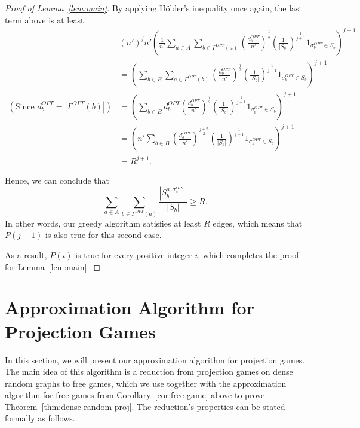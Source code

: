 \documentclass{article}
\begin{document}
\begin{proof}[Proof of Lemma~\ref{lem:main}]
By applying H\"{o}lder's inequality once again, the last term above is at least
\begin{align*}
  &(n')^j n' \left(\frac{1}{n'} \sum_{a \in A} \sum_{b \in \Gamma^{OPT}(a)} \left(\frac{d^{OPT}_b}{n'}\right)^\frac{j}{2}\left(\frac{1}{|S_b|}\right)^\frac{1}{j+1}1_{\sigma_b^{OPT} \in S_b}\right)^{j+1} \\
  &= \left(\sum_{b \in B} \sum_{a \in \Gamma^{OPT}(b)} \left(\frac{d^{OPT}_b}{n'}\right)^\frac{j}{2}\left(\frac{1}{|S_b|}\right)^\frac{1}{j+1}1_{\sigma_b^{OPT} \in S_b}\right)^{j+1} \\
  (\text{Since } d_b^{OPT} = |\Gamma^{OPT}(b)|) &= \left(\sum_{b \in B} d^{OPT}_b \left(\frac{d^{OPT}_b}{n'}\right)^\frac{j}{2}\left(\frac{1}{|S_b|}\right)^\frac{1}{j+1}1_{\sigma_b^{OPT} \in S_b}\right)^{j+1} \\
  &= \left(n' \sum_{b \in B} \left(\frac{d^{OPT}_b}{n'}\right)^\frac{j+2}{2}\left(\frac{1}{|S_b|}\right)^\frac{1}{j+1}1_{\sigma_b^{OPT} \in S_b}\right)^{j+1} \\
  &= R^{j+1}.
\end{align*}

Hence, we can conclude that $$\sum_{a \in A} \sum_{b \in \Gamma^{OPT}(a)} \frac{|S^{a, \sigma^{OPT}_a}_b|}{|S_b|} \geq R.$$ In other words, our greedy algorithm satisfies at least $R$ edges, which means that $P(j + 1)$ is also true for this second case.

As a result, $P(i)$ is true for every positive integer $i$, which completes the proof for Lemma~\ref{lem:main}.
\end{proof}

\section{Approximation Algorithm for Projection Games}

In this section, we will present our approximation algorithm for projection games. The main idea of this algorithm is a reduction from projection games on dense random graphs to free games, which we use together with the approximation algorithm for free games from Corollary~\ref{cor:free-game} above to prove Theorem~\ref{thm:dense-random-proj}. The reduction's properties can be stated formally as follows. \\
\end{document}
